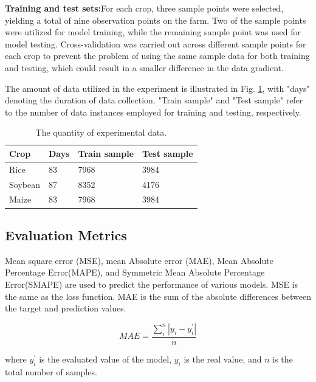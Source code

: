 \documentclass[acmsmall, screen]{acmart}
\begin{document}
\textbf{Training and test sets:}For each crop, three sample points were selected, yielding a total of nine observation points on the farm. Two of the sample points were utilized for model training, while the remaining sample point was used for model testing. Cross-validation was carried out across different sample points for each crop to prevent the problem of using the same sample data for both training and testing, which could result in a smaller difference in the data gradient.

The amount of data utilized in the experiment is illustrated in Fig. \ref{dataset_size}, with "days" denoting the duration of data collection. "Train sample" and "Test sample" refer to the number of data instances employed for training and testing, respectively.


\begin{table}[htbp]
  \centering
  \caption{The quantity of experimental data.}
    \begin{tabular}{llll}
    \toprule
    Crop  & Days & Train sample & Test sample \\
    \midrule
    Rice  & 83    & 7968  & 3984 \\
    Soybean & 87    & 8352  & 4176 \\
    Maize & 83    & 7968  & 3984 \\
    \bottomrule
    \end{tabular}%
  \label{dataset_size}%
\end{table}%


\subsection{Evaluation Metrics}
Mean square error (MSE), mean Absolute error (MAE), Mean Absolute Percentage Error(MAPE), and Symmetric Mean Absolute Percentage Error(SMAPE) are used to predict the performance of various models. MSE is the same as the loss function. MAE is the sum of the absolute differences between the target and prediction values.


\begin{equation}
  MAE=\frac{\sum_{i}^{n}\left|y_i-y_i^\prime\right|}{n} \label{mae}
\end{equation}

where \begin{math}
  y_i^\prime
\end{math} is the evaluated value of the model, \begin{math}
  y_i
\end{math} is the real value, and \begin{math}
  n
\end{math} is the total number of samples.
\end{document}
